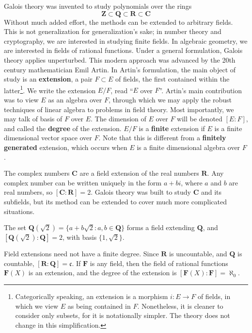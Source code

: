 Galois theory was invented to study polynomials over the rings
%
\[ \mathbf{Z} \subset \mathbf{Q} \subset \mathbf{R} \subset \mathbf{C} \]
%
Without much added effort, the methods can be extended to arbitrary fields. This is not generalization for generalization's sake; in number theory and cryptography, we are interested in studying finite fields. In algebraic geometry, we are interested in fields of rational functions. Under a general formulation, Galois theory applies unperturbed. This modern approach was advanced by the 20th century mathematician Emil Artin. In Artin's formulation, the main object of study is an {\bf extension}, a pair $F \subset E$ of fields, the first contained within the latter\footnote{Categorically speaking, an extension is a morphism $i: E \to F$ of fields, in which we view $E$ as being contained in $F$. Nonetheless, it is cleaner to consider only subsets, for it is notationally simpler. The theory does not change in this simplification.}. We write the extension $E/F$, read ``$E$ over $F$''. Artin's main contribution was to view $E$ as an algebra over $F$, through which we may apply the robust techniques of linear algebra to problems in field theory. Most importantly, we may talk of basis of $F$ over $E$. The dimension of $E$ over $F$ will be denoted $[E:F]$, and called the {\bf degree} of the extension. $E/F$ is a {\bf finite} extension if $E$ is a finite dimensional vector space over $F$. Note that this is different from a {\bf finitely generated} extension, which occurs when $E$ is a finite dimensional algebra over $F$.

\begin{example}
    The complex numbers $\mathbf{C}$ are a field extension of the real numbers $\mathbf{R}$. Any complex number can be written uniquely in the form $a + bi$, where $a$ and $b$ are real numbers, so $[\mathbf{C}: \mathbf{R}] = 2$. Galois theory was built to study $\mathbf{C}$ and its subfields, but its method can be extended to cover much more complicated situations.
\end{example}

\begin{example}
    The set $\mathbf{Q}(\sqrt{2}) = \{ a + b \sqrt{2} : a,b \in \mathbf{Q} \}$ forms a field extending $\mathbf{Q}$, and $[\mathbf{Q}(\sqrt{2}): \mathbf{Q}] = 2$, with basis $\{ 1, \sqrt{2} \}$.
\end{example}

\begin{example}
    Field extensions need not have a finite degree. Since $\mathbf{R}$ is uncountable, and $\mathbf{Q}$ is countable, $[\mathbf{R}: \mathbf{Q}] = \mathfrak{c}$. If $\mathbf{F}$ is any field, then the field of rational functions $\mathbf{F}(X)$ is an extension, and the degree of the extension is $[\mathbf{F}(X) : \mathbf{F}] = \aleph_0$.
\end{example}


